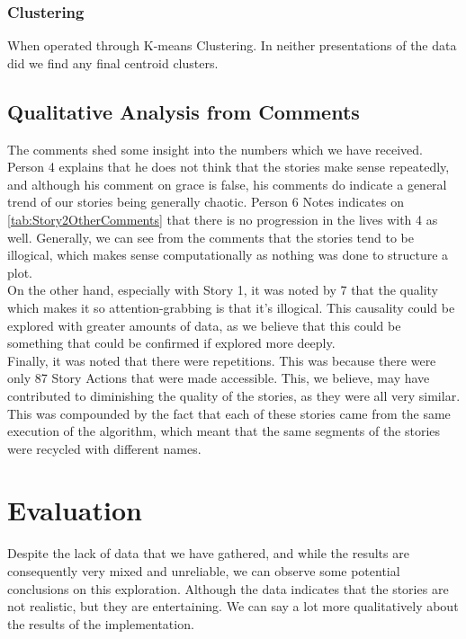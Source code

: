 \documentclass[11pt]{article}
\begin{document}
\subsubsection{Clustering}
When operated through K-means Clustering. In neither presentations of the data did we find any final centroid clusters.\\
\subsection{Qualitative Analysis from Comments}
The comments shed some insight into the numbers which we have received. Person 4 explains that he does not think that the stories make sense repeatedly, and although his comment on grace is false, his comments do indicate a general trend of our stories being generally chaotic. Person 6 Notes indicates on \ref{tab:Story2OtherComments} that there is no progression in the lives with 4 as well. Generally, we can see from the comments that the stories tend to be illogical, which makes sense computationally as nothing was done to structure a plot.\\

On the other hand, especially with Story 1, it was noted by 7 that the quality which makes it so attention-grabbing is that it's illogical. This causality could be explored with greater amounts of data, as we believe that this could be something that could be confirmed if explored more deeply.\\

Finally, it was noted that there were repetitions. This was because there were only 87 Story Actions that were made accessible. This, we believe, may have contributed to diminishing the quality of the stories, as they were all very similar. This was compounded by the fact that each of these stories came from the same execution of the algorithm, which meant that the same segments of the stories were recycled with different names. 

\section{Evaluation}
Despite the lack of data that we have gathered, and while the results are consequently very mixed and unreliable, we can observe some potential conclusions on this exploration. Although the data indicates that the stories are not realistic, but they are entertaining. We can say a lot more qualitatively about the results of the implementation.\\
\end{document}

